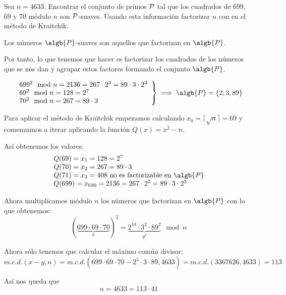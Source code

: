 \begin{problem}[6]
Sea $n=4633$. Encontrar el conjunto de primos $\cal P$ tal que los cuadrados de 699, 69 y 70 m\'odulo $n$ son $\cal P$-suaves. Usando esta informaci\'on factorizar $n$ con en el m\'etodo de Kraitchik.
\solution


Los números $\algb{P}$-suaves son aquellos que factorizan en $\algb{P}$. 

Por tanto, lo que tenemos que hacer es factorizar los cuadrados de los números que se nos dan y agrupar estos factores formando el conjunto $\algb{P}$.


\[\left.\begin{array}{l}
699^2 \mod n = 2136 = 267 \cdot 2^3 = 89 \cdot 3 \cdot 2^3 \\
69^2 \mod n = 128 = 2^7 \\
70^2 \mod n = 267 = 89 \cdot 3
\end{array}\right\} \implies \algb{P} = \{ 2,3,89\}\]

Para aplicar el método de Kraitchik empezamos calculando $x_0=\lceil \sqrt{n} \rceil=69$ y comenzamos a iterar aplicando la función $Q(x)=x^2-n$.

Así obtenemos los valores:
\[\begin{array}{l}
Q(69) = x_1 = 128 = 2^{7}\\
Q(70) = x_2 = 267 = 89 \cdot 3  \\
Q(71) = x_3 = 408 \text{ no es factorizable en } \algb{P} \\
Q(699) = x_{630} = 2136 = 267 \cdot 2^3 = 89 \cdot 3 \cdot 2^3 
\end{array}\]

Ahora multiplicamos módulo $n$ los números que factorizan en $\algb{P}$ con lo que obtenemos:
\[(\underbrace{699 \cdot 69 \cdot 70}_{x})^2 = \underbrace{2^{10}\cdot 3^2 \cdot 89^2}_{y^2} \mod n\]

Ahora sólo tenemos que calcular el máximo común divisor:
\[m.c.d.(x-y,n)= m.c.d.\left(699 \cdot 69 \cdot 70 - 2^{5}\cdot 3 \cdot 89, 4633\right) = m.c.d.(3367626, 4633) = 113\]

Así nos queda que
\[n = 4633 = 113 \cdot 41\]
\end{problem}

